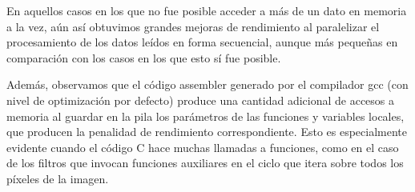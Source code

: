 \documentclass[a4paper,10pt,twoside]{article}
\begin{document}
En aquellos casos en los que no fue posible acceder a más de un dato en memoria a la vez, aún así obtuvimos grandes mejoras de rendimiento al paralelizar el procesamiento de los datos leídos en forma secuencial, aunque más pequeñas en comparación con los casos en los que esto sí fue posible.

Además, observamos que el código assembler generado por el compilador gcc (con nivel de optimización por defecto) produce una cantidad adicional de accesos a memoria al guardar en la pila los parámetros de las funciones y variables locales, que producen la penalidad de rendimiento correspondiente. Esto es especialmente evidente cuando el código C hace muchas llamadas a funciones, como en el caso de los filtros que invocan funciones auxiliares en el ciclo que itera sobre todos los píxeles de la imagen.
\end{document}
